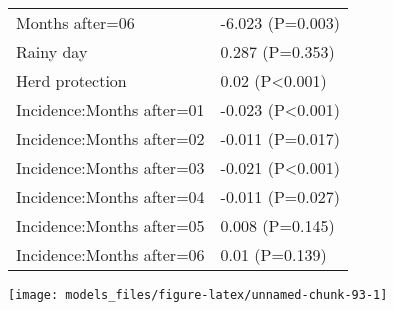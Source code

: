 \documentclass[]{article}
\begin{document}
\begin{longtable}[t]{ll}
\hspace{1em}Months after=06 & -6.023 (P=0.003)\\
\hspace{1em}Rainy day & 0.287 (P=0.353)\\
\hspace{1em}Herd protection & 0.02 (P<0.001)\\
\hspace{1em}Incidence:Months after=01 & -0.023 (P<0.001)\\
\hspace{1em}Incidence:Months after=02 & -0.011 (P=0.017)\\
\hspace{1em}Incidence:Months after=03 & -0.021 (P<0.001)\\
\hspace{1em}Incidence:Months after=04 & -0.011 (P=0.027)\\
\hspace{1em}Incidence:Months after=05 & 0.008 (P=0.145)\\
\hspace{1em}Incidence:Months after=06 & 0.01 (P=0.139)\\*
\end{longtable}

\begin{center}\texttt{[image: models\_files/figure-latex/unnamed-chunk-93-1]} \end{center}

\newpage
\end{document}
